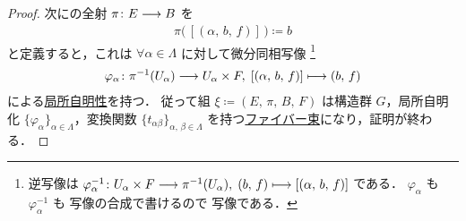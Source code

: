 \documentclass[TQFT_main]{subfiles}
\begin{document}
\begin{proof}
	次に\cinfty の全射 $\pi \colon E \longrightarrow B$ を
	\begin{align}
		\pi \bigl(\, [(\alpha,\, b,\, f)]\, \bigr) \coloneqq b
	\end{align}
	と定義すると，これは $\forall \alpha \in \Lambda$ に対して微分同相写像
    \footnote{
        逆写像は $\varphi_\alpha^{-1} \colon U_\alpha \times F \longrightarrow \pi^{-1}(U_\alpha),\; (b,\, f) \longmapsto [(\alpha,\, b,\, f)]$ である．
        $\varphi_\alpha$ も $\varphi_\alpha^{-1}$ も \cinfty 写像の合成で書けるので \cinfty 写像である．
    }
	\begin{align}
		\varphi_\alpha \colon \pi^{-1}(U_\alpha) \longrightarrow U_\alpha \times F,\; [(\alpha,\, b,\, f)] \longmapsto (b,\, f)
	\end{align}
	による\hyperref[fig.bundle_homo]{局所自明性}を持つ．
	従って組 $\xi \coloneqq (E,\, \pi,\, B,\, F)$ は構造群 $G$，局所自明化 $\{\varphi_\alpha\}_{\alpha \in \Lambda}$，変換関数 $\{t_{\alpha\beta}\}_{\alpha,\, \beta \in \Lambda}$ を持つ\hyperref[def.fiber-1]{ファイバー束}になり，証明が終わる．
\end{proof}


\end{document}
